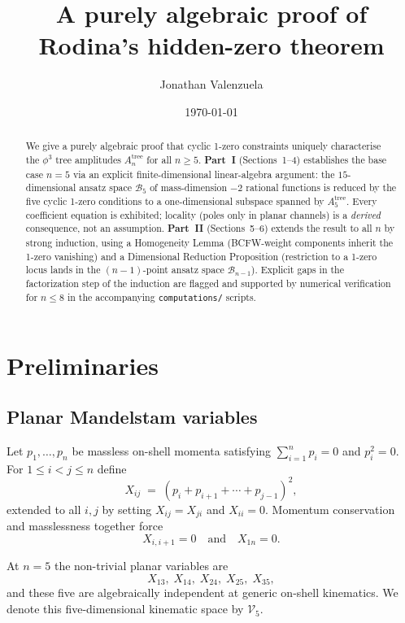 \documentclass[11pt]{article}
\title{A purely algebraic proof of Rodina's hidden-zero theorem}
\author{Jonathan Valenzuela}
\date{\today}
\theoremstyle{plain}
\theoremstyle{definition}
\newcommand{\cV}{\mathcal{V}}
\newcommand{\cB}{\mathcal{B}}
\begin{document}
\maketitle

\begin{abstract}
We give a purely algebraic proof that cyclic 1-zero constraints uniquely characterise
the $\phi^3$ tree amplitudes $A_n^{\mathrm{tree}}$ for all $n \geq 5$.
\textbf{Part~I} (Sections~1--4) establishes the base case $n=5$ via an explicit
finite-dimensional linear-algebra argument: the $15$-dimensional ansatz space
$\cB_5$ of mass-dimension $-2$ rational functions is reduced by the five cyclic
1-zero conditions to a one-dimensional subspace spanned by $A_5^{\mathrm{tree}}$.
Every coefficient equation is exhibited; locality (poles only in planar channels)
is a \emph{derived} consequence, not an assumption.
\textbf{Part~II} (Sections~5--6) extends the result to all $n$ by strong induction,
using a Homogeneity Lemma (BCFW-weight components inherit the 1-zero vanishing)
and a Dimensional Reduction Proposition (restriction to a 1-zero locus lands in
the $(n-1)$-point ansatz space $\cB_{n-1}$).
Explicit gaps in the factorization step of the induction are flagged and supported
by numerical verification for $n \leq 8$ in the accompanying
\texttt{computations/} scripts.
\end{abstract}

\section{Preliminaries}

\subsection{Planar Mandelstam variables}

Let $p_1, \ldots, p_n$ be massless on-shell momenta satisfying
$\sum_{i=1}^n p_i = 0$ and $p_i^2 = 0$. For $1 \le i < j \le n$ define
\begin{equation}
X_{ij} \;=\; (p_i + p_{i+1} + \cdots + p_{j-1})^2,
\end{equation}
extended to all $i, j$ by setting $X_{ij} = X_{ji}$ and $X_{ii} = 0$. Momentum
conservation and masslessness together force
\begin{equation}
X_{i,i+1} = 0 \quad \text{and} \quad X_{1n} = 0.
\end{equation}

At $n = 5$ the non-trivial planar variables are
\[
X_{13}, \; X_{14}, \; X_{24}, \; X_{25}, \; X_{35},
\]
and these five are algebraically independent at generic on-shell kinematics. We denote
this five-dimensional kinematic space by $\cV_5$.
\end{document}
